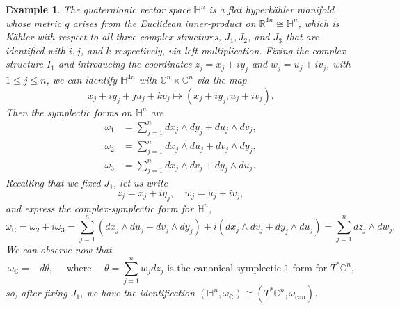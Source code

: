\documentclass{article}
\newtheorem{example}{Example}
\newcommand{\w}{\omega}
\newcommand{\RR}{\mathbb{R}}
\newcommand{\CC}{\mathbb{C}}
\newcommand{\HH}{\mathbb{H}}
\begin{document}
	\begin{example}
		The quaternionic vector space $\HH^{n}$ is a flat hyperk\"ahler manifold whose metric $g$ arises from the Euclidean inner-product on $\RR^{4n}\cong \HH^{n}$, which is K\"ahler with respect to all three complex structures, $J_{1}, J_{2}$, and $J_{3}$ that are identified with $i, j$, and $k$ respectively, via left-multiplication. Fixing the complex structure $I_{1}$ and introducing the coordinates $z_{j} = x_{j} + i y_{j}$ and $w_{j} = u_{j} + i v_{j}$, with $1 \leq j \leq n$, we can identify $\HH^{4n}$ with $\CC^{n} \times \CC^{n}$ via the map
		\[
		x_{j} + iy_{j} + ju_{j} + kv_{j} \mapsto (x_{j} + iy_{j}, u_{j} + iv_{j}).
		\]
		Then the symplectic forms on $\HH^{n}$ are
		\begin{equation*}
			\begin{split}
				\w_{1} &= \sum_{j=1}^{n} dx_{j} \wedge dy_{j} + du_{j} \wedge dv_{j}, \\
				\w_{2} &= \sum_{j=1}^{n} dx_{j} \wedge du_{j} + dv_{j} \wedge dy_{j}, \\
				\w_{3} &= \sum_{j=1}^{n} dx_{j} \wedge dv_{j} + dy_{j} \wedge du_{j}.
			\end{split}
		\end{equation*}
		Recalling that we fixed $J_{1}$, let us write
		\[
		z_{j} = x_{j} + iy_{j}, \quad w_{j} = u_{j} + iv_{j},
		\]
		and express the complex-symplectic form for $\HH^{n}$,
		\[
		\w_{\CC} = \w_{2} + i\w_{3} = \sum_{j=1}^{n} \left( dx_{j} \wedge du_{j} + dv_{j} \wedge dy_{j} \right) + i \left( dx_{j} \wedge dv_{j} + dy_{j} \wedge du_{j} \right) = \sum_{j=1}^{n} dz_{j} \wedge dw_{j}.
		\]
		We can observe now that
		\[
		\w_{\CC} = -d\theta, \quad \text{ where } \quad \theta = \sum_{j=1}^{n} w_{j}dz_{j} \text{ is the canonical symplectic $1$-form for $T^{\ast}\CC^{n}$,}
		\]
		so, after fixing $J_{1}$, we have the identification $(\HH^{n}, \w_{\CC}) \cong (T^{\ast}\CC^{n}, \w_{\text{can}})$.
	\end{example}
	
\end{document}
